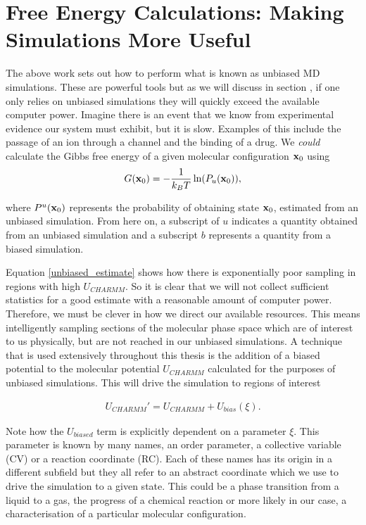 \section{Free Energy Calculations: Making Simulations More Useful}
The above work sets out how to perform what is known as unbiased MD simulations. These are powerful tools but as we will discuss in section , if one only relies on unbiased simulations they will quickly exceed the available computer power. Imagine there is an event that we know from experimental evidence our system must exhibit, but it is slow. Examples of this include the passage of an ion through a channel and the binding of a drug. We \textit{could} calculate the Gibbs free energy of a given molecular configuration $\bold{x}_0$ using 
\begin{equation}
	G (\bold{x}_0) = -\frac{1}{k_BT}\ln(P_{u}(\bold{x}_0)),
	\label{unbiased_estimate}
\end{equation}

where $P^u(\bold{x}_0)$ represents the probability of obtaining state $\bold{x}_0$, estimated from an unbiased simulation. From here on, a subscript of $u$ indicates a quantity obtained from an unbiased simulation and a subscript $b$ represents a quantity from a biased simulation. 

Equation \ref{unbiased_estimate} shows how there is exponentially poor sampling in regions with high $U_{CHARMM}$. So it is clear that we will not collect sufficient statistics for a good estimate with a reasonable amount of computer power. Therefore, we must be clever in how we direct our available resources. This means intelligently sampling sections of the molecular phase space which are of interest to us physically, but are not reached in our unbiased simulations. A technique that is used extensively throughout this thesis is the addition of a biased potential to the molecular potential $U_{CHARMM}$ calculated for the purposes of unbiased simulations. This will drive the simulation to regions of interest

\begin{equation}
\begin{aligned}
U_{CHARMM}'  = U_{CHARMM} + U_{bias} (\xi).
\end{aligned}
\end{equation}

Note how the $U_{biased}$ term is explicitly dependent on a parameter $\xi$. This parameter is known by many names, an order parameter, a collective variable (CV) or a reaction coordinate (RC). Each of these names has its origin in a different subfield but they all refer to an abstract coordinate which we use to drive the simulation to a given state. This could be a phase transition from a liquid to a gas, the progress of a chemical reaction or more likely in our case, a characterisation of a particular molecular configuration. 

